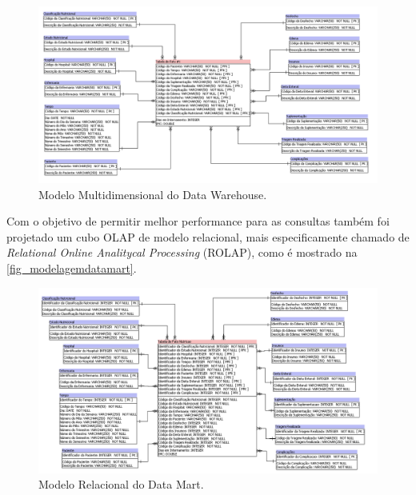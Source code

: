 \begin{figure}[htb]
	\caption{\label{fig_modelagemdatawarehouse}Modelo Multidimensional do Data Warehouse.}
	\begin{center}
	    \includegraphics[scale=0.5]{Imagens/figura - modelagem multidimensional datawarehouse.png}
	\end{center}
\end{figure}

Com o objetivo de permitir melhor performance para as consultas também foi projetado um cubo OLAP de modelo relacional, mais especificamente chamado de \textit{Relational Online Analitycal Processing} (ROLAP), como é mostrado na \autoref{fig_modelagemdatamart}.

\newpage
\begin{figure}[htb]
	\caption{\label{fig_modelagemdatamart}Modelo Relacional do Data Mart.}
	\begin{center}
	    \includegraphics[scale=0.5]{Imagens/figura - modelagem multidimensional datamart.png}
	\end{center}
\end{figure}

